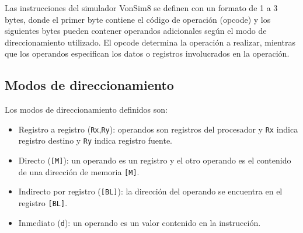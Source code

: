 \documentclass[12pt,oneside]{templates/unerthesis}
\begin{document}
Las instrucciones del simulador VonSim8 se definen con un formato de 1 a 3 bytes, donde el primer byte contiene el código de operación (opcode) y los siguientes bytes pueden contener operandos adicionales según el modo de direccionamiento utilizado. El opcode determina la operación a realizar, mientras que los operandos especifican los datos o registros involucrados en la operación.

\begin{table}[!h]
\centering
\caption{\label{tab:formatoinst}Tabla de formato de instrucciones}
\centering
{}
\end{table}

\hypertarget{modos-de-direccionamiento-1}{%
\subsection{Modos de direccionamiento}\label{modos-de-direccionamiento-1}}

Los modos de direccionamiento definidos son:

\begin{itemize}
\item
  Registro a registro (\texttt{Rx},\texttt{Ry}): operandos son registros del procesador y \texttt{Rx} indica registro destino y \texttt{Ry} indica registro fuente.
\item
  Directo (\texttt{{[}M{]}}): un operando es un registro y el otro operando es el contenido de una dirección de memoria \texttt{{[}M{]}}.
\item
  Indirecto por registro (\texttt{{[}BL{]}}): la dirección del operando se encuentra en el registro \texttt{{[}BL{]}}.
\item
  Inmediato (\texttt{d}): un operando es un valor contenido en la instrucción.
\end{itemize}
\end{document}
